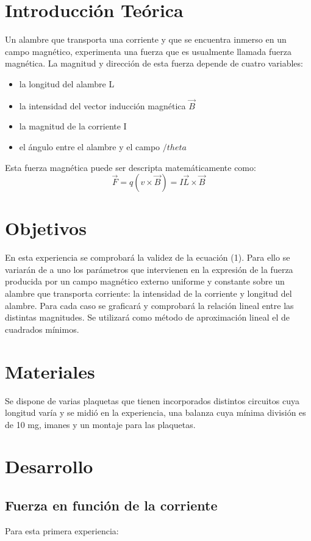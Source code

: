 \documentclass{article}
\begin{document}
\section{Introducción Teórica}
Un alambre que transporta una corriente y que se encuentra inmerso en un campo magnético, experimenta una fuerza que es usualmente llamada fuerza magnética. La magnitud y dirección de esta fuerza depende de cuatro variables:
\begin{itemize}
  \item la longitud del alambre L
  \item la intensidad del vector inducción magnética $\overrightarrow{B}$
  \item la magnitud de la corriente I
  \item el ángulo entre el alambre y el campo $/theta$
\end{itemize}
Esta fuerza magnética puede ser descripta matemáticamente como: 
\begin{equation}
\overrightarrow{F}=q (v\times \overrightarrow{B}) = I \overrightarrow{L}\times\overrightarrow{B} 
\end{equation}

\section{Objetivos}
En esta experiencia se comprobará la validez de la ecuación (1). Para ello se variarán de a
uno los parámetros que intervienen en la expresión de la fuerza producida por un campo
magnético externo uniforme y constante sobre un alambre que transporta corriente: la intensidad de
la corriente y longitud del alambre. Para cada caso se graficará y comprobará la relación lineal entre las distintas magnitudes. Se utilizará como
método de aproximación lineal el de cuadrados mínimos. 

\section{Materiales}
Se dispone de varias plaquetas que
tienen incorporados distintos circuitos cuya longitud varía y se midió en la experiencia, una balanza cuya mínima división es de 10 mg, imanes y un montaje para las plaquetas.

\section{Desarrollo}
\subsection{Fuerza en función de la corriente}
Para esta primera experiencia:
\end{document}
